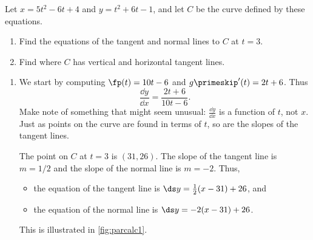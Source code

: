\begin{example}\label{ex_parcalc1}%
Let $x=5t^2-6t+4$ and $y=t^2+6t-1$, and let $C$ be the curve defined by these equations.
\begin{enumerate}
	\item	Find the equations of the tangent and normal lines to $C$ at $t=3$.
	\item	Find where $C$ has vertical and horizontal tangent lines.
\end{enumerate}
\solution
\begin{enumerate}
	\item We start by computing $\fp(t) = 10t-6$ and $g\primeskip'(t) =2t+6$. Thus \[\frac{\dd y}{\dd x} = \frac{2t+6}{10t-6}.\]
	Make note of something that might seem unusual: $\frac{\dd y}{\dd x}$ is a function of $t$, not $x$. Just as points on the curve are found in terms of $t$, so are the slopes of the tangent lines.

	The point on $C$ at $t=3$ is $(31,26)$. The slope of the tangent line is $m=1/2$ and the slope of the normal line is $m=-2$. Thus,
	\begin{itemize}
		\item the equation of the tangent line is $\ds y=\frac12(x-31)+26$, and
		\item	the equation of the normal line is $\ds y=-2(x-31)+26$.
	\end{itemize}
	This is illustrated in \autoref{fig:parcalc1}.



\end{enumerate}
\end{example}
